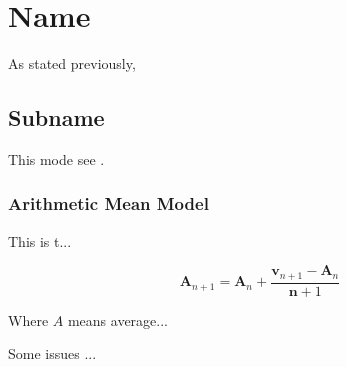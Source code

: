 \chapter{Name}

As stated previously, 

\section{Subname}

This mode see \cite{Chang2011}.

\subsection{Arithmetic Mean Model}

This is t...

\begin{equation}\label{eq:incraverage}
\boldsymbol{A}_{n+1} = \boldsymbol{A}_{n} + \frac{\boldsymbol{v}_{n+1}-\boldsymbol{A}_{n}}{\boldsymbol{n}+1}
\end{equation}

Where $A$ means average...
%

Some issues ...